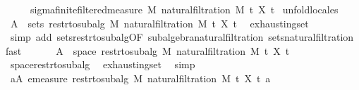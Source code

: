 \begin{isabellebody}
\ \ \ \ \ {\isachardoublequoteopen}sigma{\isacharunderscore}{\kern0pt}finite{\isacharunderscore}{\kern0pt}filtered{\isacharunderscore}{\kern0pt}measure\ M\ {\isacharparenleft}{\kern0pt}natural{\isacharunderscore}{\kern0pt}filtration\ M\ t\ X{\isacharparenright}{\kern0pt}\ t\isanewline
%
\isadelimproof
%
\endisadelimproof
%
\isatagproof
{}\isamarkupfalse%
\ {\isacharparenleft}{\kern0pt}unfold{\isacharunderscore}{\kern0pt}locales{\isacharparenright}{\kern0pt}\isanewline
\ \ \isamarkupfalse%
\ {\isachardoublequoteopen}A\ {\isasymsubseteq}\ sets\ {\isacharparenleft}{\kern0pt}restr{\isacharunderscore}{\kern0pt}to{\isacharunderscore}{\kern0pt}subalg\ M\ {\isacharparenleft}{\kern0pt}natural{\isacharunderscore}{\kern0pt}filtration\ M\ t\ X\ t\ \isamarkupfalse%
\ exhausting{\isacharunderscore}{\kern0pt}set\ \isamarkupfalse%
\ {\isacharparenleft}{\kern0pt}simp\ add{\isacharcolon}{\kern0pt}\ sets{\isacharunderscore}{\kern0pt}restr{\isacharunderscore}{\kern0pt}to{\isacharunderscore}{\kern0pt}subalg{\isacharbrackleft}{\kern0pt}OF\ subalgebra{\isacharunderscore}{\kern0pt}natural{\isacharunderscore}{\kern0pt}filtration{\isacharbrackright}{\kern0pt}\ sets{\isacharunderscore}{\kern0pt}natural{\isacharunderscore}{\kern0pt}filtration{\isacharparenright}{\kern0pt}\ fast\isanewline
\ \ \isamarkupfalse%
\ \isamarkupfalse%
\ {\isachardoublequoteopen}{\isasymUnion}\ A\ {\isacharequal}{\kern0pt}\ space\ {\isacharparenleft}{\kern0pt}restr{\isacharunderscore}{\kern0pt}to{\isacharunderscore}{\kern0pt}subalg\ M\ {\isacharparenleft}{\kern0pt}natural{\isacharunderscore}{\kern0pt}filtration\ M\ t\ X\ t\ \isamarkupfalse%
\ space{\isacharunderscore}{\kern0pt}restr{\isacharunderscore}{\kern0pt}to{\isacharunderscore}{\kern0pt}subalg\ \isamarkupfalse%
\ exhausting{\isacharunderscore}{\kern0pt}set\ \isamarkupfalse%
\ simp\isanewline
\ \ \isamarkupfalse%
\ \isamarkupfalse%
\ {\isachardoublequoteopen}{\isasymforall}a{\isasymin}A{\isachardot}{\kern0pt}\ emeasure\ {\isacharparenleft}{\kern0pt}restr{\isacharunderscore}{\kern0pt}to{\isacharunderscore}{\kern0pt}subalg\ M\ {\isacharparenleft}{\kern0pt}natural{\isacharunderscore}{\kern0pt}filtration\ M\ t\ X\ t\ a\ {\isasymnoteq}\ {\isasyminfinity}{\isachardoublequoteclose}\ \isamarkupfalse%

\end{isabellebody}
